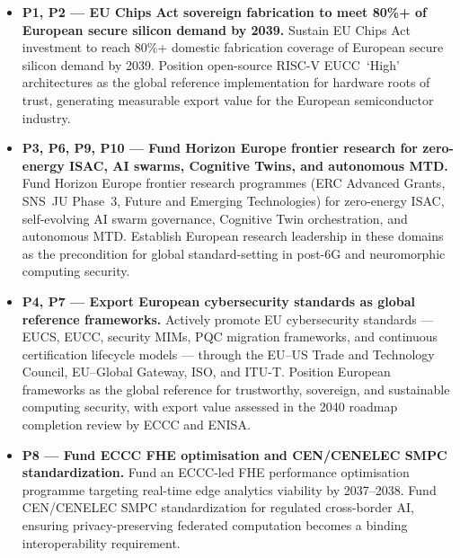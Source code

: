 \documentclass{ieeeaccess}
\begin{document}
\begin{itemize}

    \item \textbf{P1, P2 --- EU Chips Act sovereign fabrication to
    meet 80\%+ of European secure silicon demand by 2039.}
    Sustain EU Chips Act investment to reach 80\%+ domestic fabrication
    coverage of European secure silicon demand by 2039. Position
    open-source RISC-V EUCC~`High' architectures as the global
    reference implementation for hardware roots of trust, generating
    measurable export value for the European semiconductor industry.

    \item \textbf{P3, P6, P9, P10 --- Fund Horizon Europe frontier
    research for zero-energy ISAC, AI swarms, Cognitive Twins, and
    autonomous MTD.}
    Fund Horizon Europe frontier research programmes (ERC Advanced
    Grants, SNS~JU Phase~3, Future and Emerging Technologies) for
    zero-energy ISAC, self-evolving AI swarm governance, Cognitive
    Twin orchestration, and autonomous MTD. Establish European
    research leadership in these domains as the precondition for
    global standard-setting in post-6G and neuromorphic computing
    security.

    \item \textbf{P4, P7 --- Export European cybersecurity standards
    as global reference frameworks.}
    Actively promote EU cybersecurity standards --- EUCS, EUCC,
    security MIMs, PQC migration frameworks, and continuous
    certification lifecycle models --- through the EU--US Trade and
    Technology Council, EU--Global Gateway, ISO, and ITU-T.
    Position European frameworks as the global reference for
    trustworthy, sovereign, and sustainable computing security,
    with export value assessed in the 2040 roadmap completion
    review by ECCC and ENISA.

    \item \textbf{P8 --- Fund ECCC FHE optimisation and CEN/CENELEC
    SMPC standardization.}
    Fund an ECCC-led FHE performance optimisation programme targeting
    real-time edge analytics viability by 2037--2038. Fund
    CEN/CENELEC SMPC standardization for regulated cross-border AI,
    ensuring privacy-preserving federated computation becomes a
    binding interoperability requirement.

\end{itemize}
\end{document}

